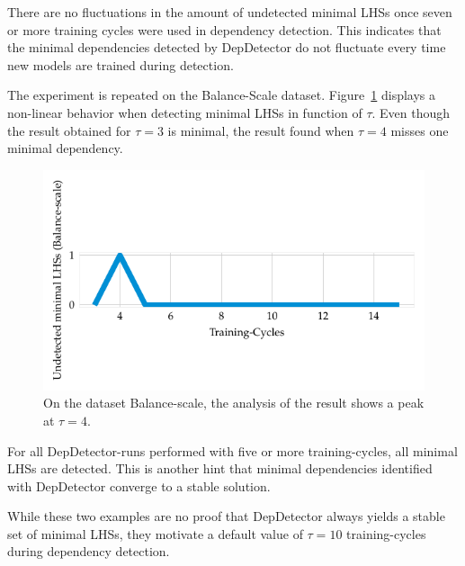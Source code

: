 There are no fluctuations in the amount of undetected minimal LHSs once seven or more training cycles were used in dependency detection.
This indicates that the minimal dependencies detected by DepDetector do not fluctuate every time new models are trained during detection.

The experiment is repeated on the Balance-Scale dataset.
Figure~\ref{fig:dep_detector_lhs_stability_balance_scale} displays a non-linear behavior when detecting minimal LHSs in function of \( \tau \).
Even though the result obtained for \( \tau = 3 \) is minimal, the result found when \( \tau = 4 \) misses one minimal dependency.
\begin{figure}[ht]
     \centering
     \includegraphics[width=\textwidth]{../figures/balance-scale/dep_detector_lhs_stability.pdf}
     \caption{On the dataset Balance-scale, the analysis of the result shows a peak at \( \tau = 4 \).}
     \label{fig:dep_detector_lhs_stability_balance_scale}
\end{figure}
For all DepDetector-runs performed with five or more training-cycles, all minimal LHSs are detected.
This is another hint that minimal dependencies identified with DepDetector converge to a stable solution.

While these two examples are no proof that DepDetector always yields a stable set of minimal LHSs, they motivate a default value of \( \tau = 10 \) training-cycles during dependency detection.
